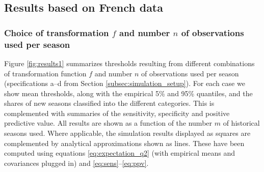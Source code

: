 \documentclass{article}
\begin{document}
\subsection{Results based on French data}

\subsubsection{Choice of transformation $f$ and number $n$ of observations used per season}

Figure \ref{fig:results1} summarizes thresholds resulting from different combinations of transformation function $f$ and number $n$ of observations used per season (specifications a--d from Section \ref{subsec:simulation_setup}). For each case we show mean thresholds, along with the empirical 5\% and 95\% quantiles, and the shares of new seasons classified into the different categories. This is complemented with summaries of the sensitivity, specificity and positive predictive value. All results are shown as a function of the number $m$ of historical seasons used. Where applicable, the simulation results displayed as squares are complemented by analytical approximations shown as lines. These have been computed using equations \eqref{eq:expectation_q2} (with empirical means and covariances plugged in) and \eqref{eq:sens}--\eqref{eq:ppv}.
\end{document}
